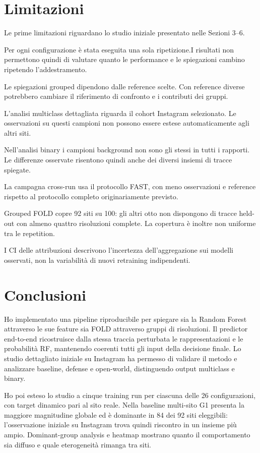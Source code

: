 \documentclass[11pt,a4paper]{article}
\begin{document}
\section{Limitazioni}
Le prime limitazioni riguardano lo studio iniziale presentato nelle Sezioni 3--6.

Per ogni configurazione è stata eseguita una sola ripetizione.I risultati non permettono quindi di valutare quanto le performance e le spiegazioni cambino ripetendo l'addestramento.

Le spiegazioni grouped dipendono dalle reference scelte. Con reference diverse potrebbero cambiare il riferimento di confronto e i contributi dei gruppi.

L'analisi multiclass dettagliata riguarda il cohort Instagram selezionato. Le osservazioni su questi campioni non possono essere estese automaticamente agli altri siti.

Nell'analisi binary i campioni background non sono gli stessi in tutti i rapporti. Le differenze osservate risentono quindi anche dei diversi insiemi di tracce spiegate.

La campagna cross-run usa il protocollo FAST, con meno osservazioni e reference rispetto al protocollo completo originariamente previsto.

Grouped FOLD copre 92 siti su 100: gli altri otto non dispongono di tracce held-out con almeno quattro risoluzioni complete. La copertura è inoltre non uniforme tra le repetition.

I CI delle attribuzioni descrivono l'incertezza dell'aggregazione sui modelli osservati, non la variabilità di nuovi retraining indipendenti.

\section{Conclusioni}
Ho implementato una pipeline riproducibile per spiegare sia la Random Forest attraverso le sue feature sia FOLD attraverso gruppi di risoluzioni. Il predictor end-to-end ricostruisce dalla stessa traccia perturbata le rappresentazioni e le probabilità RF, mantenendo coerenti tutti gli input della decisione finale. Lo studio dettagliato iniziale su Instagram ha permesso di validare il metodo e analizzare baseline, defense e open-world, distinguendo output multiclass e binary.

Ho poi esteso lo studio a cinque training run per ciascuna delle 26 configurazioni, con target dinamico pari al sito reale. Nella baseline multi-sito G1 presenta la maggiore magnitudine globale ed è dominante in 84 dei 92 siti eleggibili: l'osservazione iniziale su Instagram trova quindi riscontro in un insieme più ampio. Dominant-group analysis e heatmap mostrano quanto il comportamento sia diffuso e quale eterogeneità rimanga tra siti.
\end{document}
